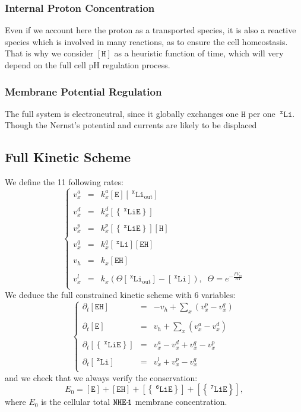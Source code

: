 \documentclass[aps,onecolumn,11pt]{revtex4}
\newcommand{\mychem}[1]{\mathtt{#1}}
\newcommand{\myconc}[1]{\left\lbrack{#1}\right\rbrack}
\newcommand{\spLi}[1]{{~^{\mychem{#1}}\mychem{Li}}}
\newcommand{\Li}[1]{\myconc{\spLi{#1}}}
\newcommand{\spEout}{\mychem{E}}
\newcommand{\Eout}{\myconc{\spEout}}
\newcommand{\spLiE}[1]{\left\lbrace\spLi{#1}\spEout\right\rbrace}
\newcommand{\LiE}[1]{\myconc{\spLiE{#1}}}
\newcommand{\spLiOut}[1]{{\spLi{#1}}_{\mathrm{out}}}
\newcommand{\LiOut}[1]{\myconc{\spLiOut{#1}}}
\newcommand{\spEHin}{\mychem{EH}}
\newcommand{\EHin}{\myconc{\spEHin}}
\newcommand{\spproton}{\mychem{H}}
\newcommand{\proton}{\myconc{\spproton}}
\newcommand{\NHE}[1]{\mychem{NHE}{\mychem{\hbox{-}\!#1}}}
\newcommand{\todo}[1]{\framebox{\textbf{\color{WildStrawberry}{#1}}}}
\begin{document}
\subsubsection{Internal Proton Concentration}
Even if we account here the proton as a transported species, it is also a reactive species which is involved in many reactions, as to ensure the cell homeostasis\todo{ref}. That is why we consider $\proton$ as a heuristic function of time, which will very depend on the full cell pH regulation process.

\subsubsection{Membrane Potential Regulation}
The full system is electroneutral, since it globally exchanges one $\spproton$ per one $\spLi{x}$. Though the Nernst's potential and currents are likely to be displaced \todo{more explanations?}

\subsection{Full Kinetic Scheme}
We define the 11 following rates:
\begin{equation}
	\label{eq:rates}
\left\lbrace
\begin{array}{rcl}
	v^a_x & = & k^a_x \Eout \LiOut{x} \\
	\\
	v^d_x & = & k^d_x \LiE{x} \\
	\\
	v^p_x & = & k^p_x \LiE{x} \proton\\
	\\
	v^q_x & = & k^q_x \Li{x} \EHin\\
	\\
	v_h   & = & k_x \EHin\\
	\\
	v^l_x & = & k_x\left(\Theta \LiOut{x} - \Li{x}\right),\;\;\Theta = e^{-\frac{FV_m}{RT}}\\
\end{array}
\right.
\end{equation}
We deduce the full constrained kinetic scheme with 6 variables:
\begin{equation}
	\label{eq:full}
\left\lbrace
\begin{array}{rcl}
\partial_t \EHin & = & -v_h + \sum_x\left(v^p_x - v^q_x\right)\\
\\
\partial_t \Eout & = & v_h + \sum_x(v^a_x -v^d_x)\\
\\
\partial_t \LiE{x} & = & v^a_x -v^d_x + v^q_x -v^p_x\\
\\
\partial_t \Li{x}  & = & v^l_x + v^p_x - v^q_x\\
\end{array}
\right.
\end{equation}
and we check that we always verify the conservation:
\begin{equation}
	E_0  =  \Eout + \EHin + \LiE{6} + \LiE{7},
\end{equation}
where $E_0$ is the cellular total $\NHE{1}$ membrane concentration.
\end{document}
